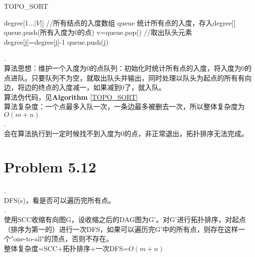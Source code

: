 \documentclass[twocolumn]{ctexart}
\begin{document}
\begin{algorithm}
	\caption{TOPO\_SORT}
	\label{TOPO_SORT}
	\begin{algorithmic}[1]
	\STATE 	degree[1...$\lvert V \rvert$] //所有结点的入度数组
	\STATE queue
	\STATE  统计所有点的入度，存入degree[]
	\STATE queue.push(所有入度为0的点)
		\STATE v=queue.pop() //取出队头元素
			\STATE degree[j]=degree[j]-1
				\STATE queue.push(j)
			\ENDIF
		\ENDFOR
	\ENDWHILE
	

	\end{algorithmic}
\end{algorithm}
.\\
\indent 算法思想：维护一个入度为0的点队列：初始化时统计所有点的入度，将入度为0的点进队。只要队列不为空，就取出队头并输出，同时处理以队头为起点的所有有向边，将边的终点的入度减一，如果减到0了，就入队。\\
\indent 算法伪代码，见\textbf{Algorithm }\ref{TOPO_SORT}\\
\indent 算法复杂度：一个点最多入队一次，一条边最多被删去一次，所以整体复杂度为$O(m+n)$\\

.\\
\indent 会在算法执行到一定时候找不到入度为0的点，非正常退出，拓扑排序无法完成。\\

\section*{Problem 5.12}
.\\
\indent DFS(s)，看是否可以遍历完所有点。\\

.\\
\indent 使用SCC收缩有向图G，设收缩之后的DAG图为G'。对G'进行拓扑排序，对起点（排序为第一的）进行一次DFS，如果可以遍历完G'中的所有点，则存在这样一个"one-to-all"的顶点，否则不存在。\\
\indent 整体复杂度=SCC+拓扑排序+一次DFS=$O(m+n)$
\end{document}
